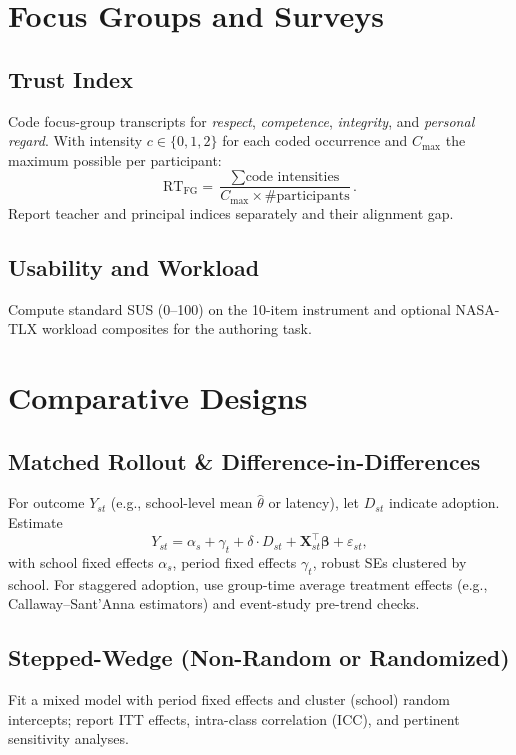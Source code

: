 \documentclass[11pt]{article}
\newcommand{\RT}{\mathrm{RT}}
\begin{document}
\section{Focus Groups and Surveys}
\subsection{Trust Index}
Code focus-group transcripts for \emph{respect}, \emph{competence}, \emph{integrity}, and \emph{personal regard}. With intensity $c \in \{0,1,2\}$ for each coded occurrence and $C_{\max}$ the maximum possible per participant:
\begin{equation}
\RT_{\mathrm{FG}} = \frac{\sum \text{code intensities}}{C_{\max} \times \#\text{participants}}.
\end{equation}
Report teacher and principal indices separately and their alignment gap.

\subsection{Usability and Workload}
Compute standard SUS (0--100) on the 10-item instrument and optional NASA-TLX workload composites for the authoring task.

\section{Comparative Designs}
\subsection{Matched Rollout \& Difference-in-Differences}
For outcome $Y_{s t}$ (e.g., school-level mean $\widehat{\theta}$ or latency), let $D_{s t}$ indicate adoption. Estimate
\begin{equation}
Y_{s t} = \alpha_s + \gamma_t + \delta \cdot D_{s t} + \bm{X}_{s t}^\top \bm{\beta} + \varepsilon_{s t},
\end{equation}
with school fixed effects $\alpha_s$, period fixed effects $\gamma_t$, robust SEs clustered by school. For staggered adoption, use group-time average treatment effects (e.g., Callaway--Sant'Anna estimators) and event-study pre-trend checks.

\subsection{Stepped-Wedge (Non-Random or Randomized)}
Fit a mixed model with period fixed effects and cluster (school) random intercepts; report ITT effects, intra-class correlation (ICC), and pertinent sensitivity analyses.
\end{document}
